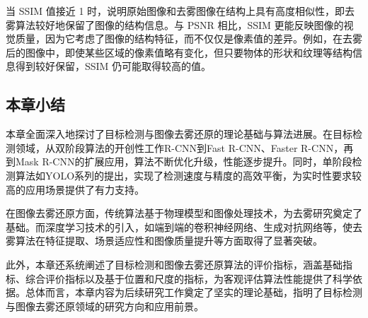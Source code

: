 当 SSIM 值接近 1 时，说明原始图像和去雾图像在结构上具有高度相似性，即去雾算法较好地保留了图像的结构信息。与 PSNR 相比，SSIM 更能反映图像的视觉质量，因为它考虑了图像的结构特征，而不仅仅是像素值的差异。例如，在去雾后的图像中，即使某些区域的像素值略有变化，但只要物体的形状和纹理等结构信息得到较好保留，SSIM 仍可能取得较高的值。

\subsection{本章小结}

本章全面深入地探讨了目标检测与图像去雾还原的理论基础与算法进展。在目标检测领域，从双阶段算法的开创性工作R-CNN到Fast R-CNN、Faster R-CNN，再到Mask R-CNN的扩展应用，算法不断优化升级，性能逐步提升。同时，单阶段检测算法如YOLO系列的提出，实现了检测速度与精度的高效平衡，为实时性要求较高的应用场景提供了有力支持。

在图像去雾还原方面，传统算法基于物理模型和图像处理技术，为去雾研究奠定了基础。而深度学习技术的引入，如端到端的卷积神经网络、生成对抗网络等，使去雾算法在特征提取、场景适应性和图像质量提升等方面取得了显著突破。

此外，本章还系统阐述了目标检测和图像去雾还原算法的评价指标，涵盖基础指标、综合评价指标以及基于位置和尺度的指标，为客观评估算法性能提供了科学依据。总体而言，本章内容为后续研究工作奠定了坚实的理论基础，指明了目标检测与图像去雾还原领域的研究方向和应用前景。
